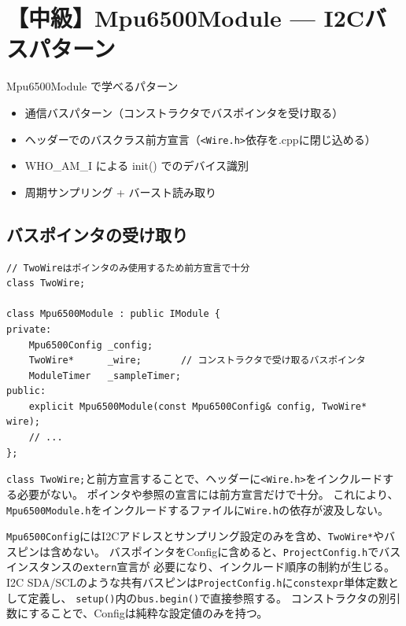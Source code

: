 \section{【中級】Mpu6500Module — I2Cバスパターン}

\begin{patternbox}{Mpu6500Module で学べるパターン}
\begin{itemize}
    \item 通信バスパターン（コンストラクタでバスポインタを受け取る）
    \item ヘッダーでのバスクラス前方宣言（\texttt{<Wire.h>}依存を.cppに閉じ込める）
    \item WHO\_AM\_I による init() でのデバイス識別
    \item 周期サンプリング + バースト読み取り
\end{itemize}
\end{patternbox}

\subsection{バスポインタの受け取り}

\begin{lstlisting}[style=cppstyle, caption={Mpu6500Module.h — バスの前方宣言とコンストラクタ}]
// TwoWireはポインタのみ使用するため前方宣言で十分
class TwoWire;

class Mpu6500Module : public IModule {
private:
    Mpu6500Config _config;
    TwoWire*      _wire;       // コンストラクタで受け取るバスポインタ
    ModuleTimer   _sampleTimer;
public:
    explicit Mpu6500Module(const Mpu6500Config& config, TwoWire* wire);
    // ...
};
\end{lstlisting}

\begin{pointbox}[ヘッダーでの前方宣言]
\texttt{class TwoWire;}と前方宣言することで、ヘッダーに\texttt{<Wire.h>}をインクルードする必要がない。
ポインタや参照の宣言には前方宣言だけで十分。
これにより、\texttt{Mpu6500Module.h}をインクルードするファイルに\texttt{Wire.h}の依存が波及しない。
\end{pointbox}

\begin{pointbox}
\texttt{Mpu6500Config}にはI2Cアドレスとサンプリング設定のみを含め、\texttt{TwoWire*}やバスピンは含めない。
バスポインタをConfigに含めると、\texttt{ProjectConfig.h}でバスインスタンスの\texttt{extern}宣言が
必要になり、インクルード順序の制約が生じる。
I2C SDA/SCLのような共有バスピンは\texttt{ProjectConfig.h}に\texttt{constexpr}単体定数として定義し、
\texttt{setup()}内の\texttt{bus.begin()}で直接参照する。
コンストラクタの別引数にすることで、Configは純粋な設定値のみを持つ。
\end{pointbox}

